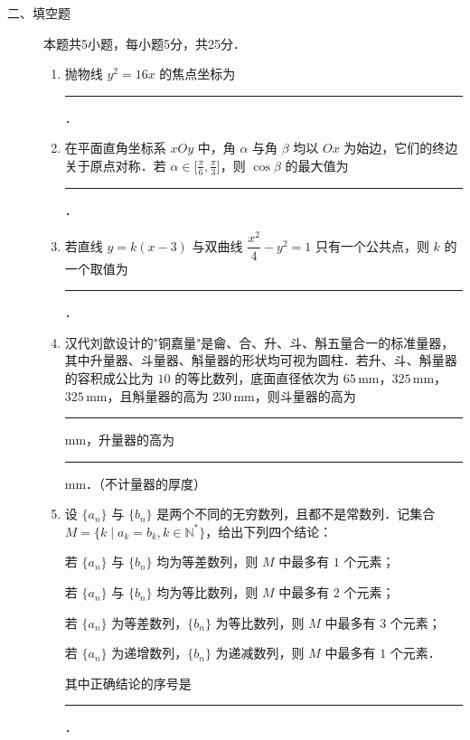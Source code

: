 \begin{description}
    \item[二、填空题] 本题共5小题，每小题5分，共25分．
    \begin{enumerate}[leftmargin=5pt]
      \addtocounter{enumi}{+10}
        \item 抛物线 $y^2=16x$ 的焦点坐标为 \rule[-0.3ex]{3em}{0.4pt}．
        \item 在平面直角坐标系 $xOy$ 中，角 $\alpha$ 与角 $\beta$ 均以 $Ox$ 为始边，它们的终边关于原点对称．若 $\alpha\in\bigl[\frac{\pi}{6},\frac{\pi}{3}\bigr]$，则 $\cos\beta$ 的最大值为 \rule[-0.3ex]{3em}{0.4pt}．
        \item 若直线 $y=k(x-3)$ 与双曲线 $\dfrac{x^2}{4}-y^2=1$ 只有一个公共点，则 $k$ 的一个取值为 \rule[-0.3ex]{3em}{0.4pt}．
        \item 汉代刘歆设计的"铜嘉量"是龠、合、升、斗、斛五量合一的标准量器，其中升量器、斗量器、斛量器的形状均可视为圆柱．若升、斗、斛量器的容积成公比为 $10$ 的等比数列，底面直径依次为 $65\,\text{mm}$，$325\,\text{mm}$，$325\,\text{mm}$，且斛量器的高为 $230\,\text{mm}$，则斗量器的高为 \rule[-0.3ex]{3em}{0.4pt} mm，升量器的高为 \rule[-0.3ex]{3em}{0.4pt} mm．（不计量器的厚度）
        \item 设 $\{a_n\}$ 与 $\{b_n\}$ 是两个不同的无穷数列，且都不是常数列．记集合 $M=\{k\mid a_k=b_k,k\in\mathbb{N}^*\}$，给出下列四个结论：

        若 $\{a_n\}$ 与 $\{b_n\}$ 均为等差数列，则 $M$ 中最多有 $1$ 个元素；
        
        若 $\{a_n\}$ 与 $\{b_n\}$ 均为等比数列，则 $M$ 中最多有 $2$ 个元素；
        
        若 $\{a_n\}$ 为等差数列，$\{b_n\}$ 为等比数列，则 $M$ 中最多有 $3$ 个元素；
        
        若 $\{a_n\}$ 为递增数列，$\{b_n\}$ 为递减数列，则 $M$ 中最多有 $1$ 个元素．
        
        其中正确结论的序号是 \rule[-0.3ex]{3em}{0.4pt}．
    \end{enumerate}
\end{description}


